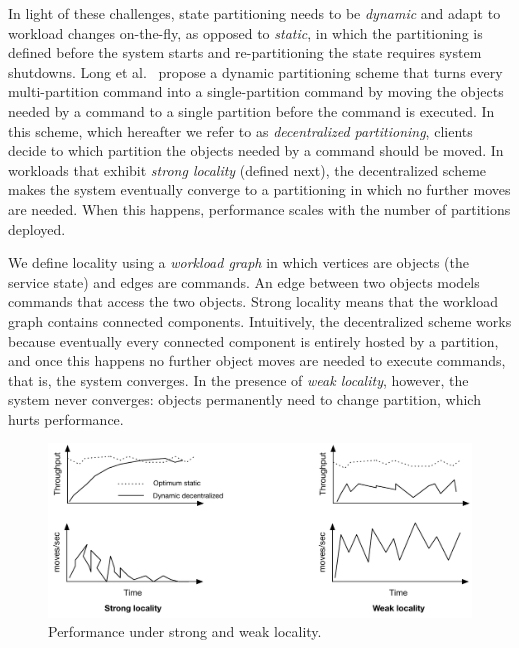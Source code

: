 In light of these challenges, state partitioning needs to be \emph{dynamic} and adapt to workload changes on-the-fly, as opposed to \emph{static}, in which the partitioning is defined before the system starts and re-partitioning the state requires system shutdowns.
Long et al.~\cite{hoang2016} propose a dynamic partitioning scheme that turns every multi-partition command into a single-partition command by moving the objects needed by a command to a single partition before the command is executed.
In this scheme, which hereafter we refer to as \emph{decentralized partitioning}, clients decide to which partition the objects needed by a command should be moved.
In workloads that exhibit \emph{strong locality} (defined next), the decentralized scheme makes the system eventually converge to a partitioning in which no further moves are needed.
When this happens, performance scales with the number of partitions deployed.

We define locality using a \emph{workload graph} in which vertices are objects (the service state) and edges are commands. 
An edge between two objects models commands that access the two objects.
Strong locality means that the workload graph contains connected components.
Intuitively, the decentralized scheme works because eventually every connected component is entirely hosted by a partition, and once this happens no further object moves are needed to execute commands, that is, the system converges.
In the presence of \emph{weak locality}, however, the system never converges: objects permanently need to change partition, which hurts performance.

\begin{figure}[ht]
	\center
	\includegraphics[width=0.6\linewidth]{figures/motivation}
	\caption{Performance under strong and weak locality.}
	\label{fig:motivation}
\end{figure}


